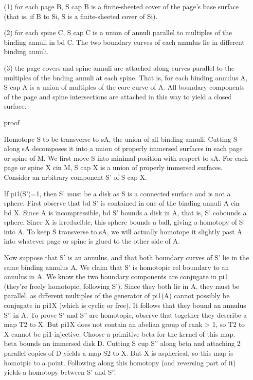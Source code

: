 (1) for each page B, S cap B is a finite-sheeted cover of the page's base
surface (that is, if B to Si, S is a finite-sheeted cover of Si).

(2) for each spine C, S cap C is a union of annuli parallel to multiples of the
binding annuli in bd C. The two boundary curves of each annulus lie in
different binding annuli.

(3) the page covers and spine annuli are attached along curves parallel to the
multiples of the bnding annuli at each spine. That is, for each binding annulus
A, S cap A is a union of multiples of the core curve of A. All boundary
components of the page and spine intersections are attached in this way to
yield a closed surface.

proof

Homotope S to be transverse to sA, the union of all binding annuli. Cutting
S along sA decomposes it into a union of properly immersed surfaces in each
page or spine of M. We first move S into minimal position with respect to sA.
For each page or spine X cin M, S cap X is a union of properly immersed
surfaces. Consider an arbitrary component S' of S cap X.

If pi1(S')=1, then S' must be a disk as S is a connected surface and is not
a sphere. First observe that bd S' is contained in one of the binding annuli
A cin bd X. Since A is incompressible, bd S' bounds a disk in A, that is, S'
cobounds a sphere. Since X is irreducible, this sphere bounds a ball, giving
a homotopy of S' into A. To keep S transverse to sA, we will actually homotope
it slightly past A into whatever page or spine is glued to the other side of A.

Now suppose that S' is an annulus, and that both boundary curves of S' lie in
the same binding annulus A. We claim that S' is homotopic rel boundary to an
annulus in A. We know the two boundary components are conjugate in pi1 (they're
freely homotopic, following S'). Since they both lie in A, they must be
parallel, as different multiples of the generator of pi1(A) cannot possibly be
conjugate in pi1X (which is cyclic or free). It follows that they bound an
annulus S'' in A.  To prove S' and S'' are homotopic, observe that together
they describe a map T2 to X. But pi1X does not contain an abelian group of rank
> 1, so T2 to X cannot be pi1-injective. Choose a primitive beta for the kernel
of this map.  beta bounds an immersed disk D. Cutting S cup S'' along beta and
attaching 2 parallel copies of D yields a map S2 to X. But X is aspherical, so
this map is homotpic to a point. Following along this homotopy (and reversing
part of it) yields a homotopy between S' and S''.

